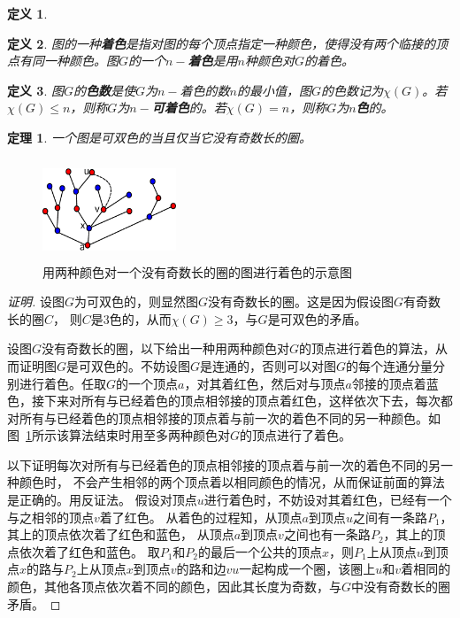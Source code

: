 \documentclass{book}[oneside]
\newtheorem{Def}{定义}[chapter]
\newtheorem{Thm}{定理}[chapter]
\begin{document}
\begin{CJK*}{UTF8}{gbsn}
\begin{Def}
  \end{Def}
  \begin{Def}
    图的一种{\bfseries 着色}是指对图的每个顶点指定一种颜色，使得没有两个临接的顶点有同一种颜色。图$G$的一个{\bfseries $n-$着色}是用$n$种颜色对$G$的着色。
  \end{Def}
  \begin{Def}
    图$G$的{\bfseries 色数}是使$G$为$n-$着色的数$n$的最小值，图$G$的色数记为$\chi(G)$。若$\chi (G) \leq n$，则称$G$为{\bfseries $n-$可着色}的。若$\chi (G) = n$，则称$G$为{\bfseries $n$色}的。
  \end{Def}
  \begin{Thm}
    一个图是可双色的当且仅当它没有奇数长的圈。
  \end{Thm}
  \renewcommand{\figurename}{图}
\begin{figure}\centering
  \includegraphics[width=4cm,height=3cm]{color26}
      \caption{用两种颜色对一个没有奇数长的圈的图进行着色的示意图}
    \label{fig:twocoloring}  
    \end{figure}
    \begin{proof}[证明]
    设图$G$为可双色的，则显然图$G$没有奇数长的圈。这是因为假设图$G$有奇数长的圈$C$，
    则$C$是3色的，从而$\chi(G) \geq 3$，与$G$是可双色的矛盾。

      设图$G$没有奇数长的圈，以下给出一种用两种颜色对$G$的顶点进行着色的算法，从而证明图$G$是可双色的。不妨设图$G$是连通的，否则可以对图$G$的每个连通分量分别进行着色。任取$G$的一个顶点$a$，对其着红色，然后对与顶点$a$邻接的顶点着蓝色，接下来对所有与已经着色的顶点相邻接的顶点着红色，这样依次下去，每次都对所有与已经着色的顶点相邻接的顶点着与前一次的着色不同的另一种颜色。如图~\ref{fig:twocoloring}所示该算法结束时用至多两种颜色对$G$的顶点进行了着色。

以下证明每次对所有与已经着色的顶点相邻接的顶点着与前一次的着色不同的另一种颜色时，
不会产生相邻的两个顶点着以相同颜色的情况，从而保证前面的算法是正确的。用反证法。
假设对顶点$u$进行着色时，不妨设对其着红色，已经有一个与之相邻的顶点$v$着了红色。
从着色的过程知，从顶点$a$到顶点$u$之间有一条路$P_1$，其上的顶点依次着了红色和蓝色，
从顶点$a$到顶点$v$之间也有一条路$P_2$，其上的顶点依次着了红色和蓝色。
取$P_1$和$P_2$的最后一个公共的顶点$x$，则$P_1$上从顶点$u$到顶点$x$的路与$P_2$上从顶点$x$到顶点$v$的路和边$vu$一起构成一个圈，该圈上$u$和$v$着相同的颜色，其他各顶点依次着不同的颜色，因此其长度为奇数，与$G$中没有奇数长的圈矛盾。 
  \end{proof}


\end{CJK*}
\end{document}
